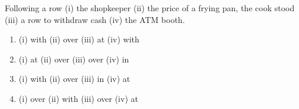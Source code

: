 Following a row \underline{\hspace{1cm}} (i) the shopkeeper \underline{\hspace{1cm}} (ii) the price of a frying pan, the cook stood \underline{\hspace{1cm}} (iii) a row to withdraw cash \underline{\hspace{1cm}} (iv) the ATM booth.
\begin{enumerate}
    \item (i) with \hspace{1em} (ii) over \hspace{1em} (iii) at \hspace{1em} (iv) with
    \item (i) at \hspace{1em} (ii) over \hspace{1em} (iii) over \hspace{1em} (iv) in
    \item (i) with \hspace{1em} (ii) over \hspace{1em} (iii) in \hspace{1em} (iv) at
    \item (i) over \hspace{1em} (ii) with \hspace{1em} (iii) over \hspace{1em} (iv) at
\end{enumerate}

